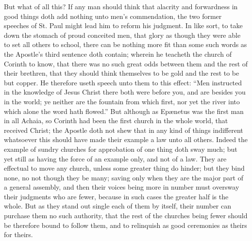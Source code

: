 But what of all this? If any man should think that alacrity  and forwardness in good things doth add nothing unto men’s commendation, the two former speeches of St. Paul might lead him to reform his judgment. In like sort, to take down the stomach of proud conceited men, that glory as though they were able to set all others to school, there can be nothing more fit than some such words as the Apostle’s third sentence doth contain; wherein he teacheth the church of Corinth to know, that there was no such great odds between them and the rest of their brethren, that they should think themselves to be gold and the rest to be but copper. He therefore useth speech unto them to this effect: “Men instructed in the knowledge of Jesus Christ there both were before you, and are besides you in the world; ye neither are the fountain from which first, nor yet the river into which alone the word hath flowed.” But although as Epænetus was the first man in all Achaia, so Corinth had been the first church in the whole world, that received Christ; the Apostle doth not shew that in any kind of things indifferent whatsoever this should have made their example a law unto all others. Indeed the example of sundry churches for approbation of one thing doth sway much; but yet still as having the force of an example only, and not of a law. They are effectual to move any church, unless some greater thing do hinder; but they bind none, no not though they be many; saving only when they are the major part of a general assembly, and then their voices being more in number must oversway their judgments who are fewer, because in such cases the greater half is the whole. But as they stand out single each of them by itself, their number can purchase them no such authority, that the rest of the churches being fewer should be therefore bound to follow them, and to relinquish as good ceremonies as theirs for theirs.

